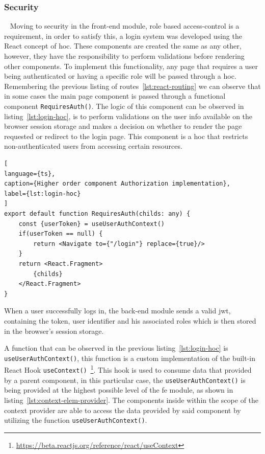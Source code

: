 \subsubsection{Security}~\label{ch:impl:sec:fe:subsec:auth}
Moving to security in the front-end module, role based access-control is a requirement, in order to satisfy this, a login system was developed using the React concept of \acrfull{hoc}. These components are created the same as any other, however, they have the responsibility to perform validations before rendering other components. To implement this functionality, any page that requires a user being authenticated or having a specific role will be passed through a \acrshort{hoc}. Remembering the previous listing of routes~\ref{lst:react-routing} we can observe that in some cases the main page component is passed through a functional component \lstinline{RequiresAuth()}. The logic of this component can be observed in listing~\ref{lst:login-hoc}, is to perform validations on the user info available on the browser session storage and makes a decision on whether to render the page requested or redirect to the login page. 
This component is a \acrshort{hoc} that restricts non-authenticated users from accessing certain resources.


\begin{lstlisting}[
language={ts},
caption={Higher order component Authorization implementation},
label={lst:login-hoc}
]
export default function RequiresAuth(childs: any) {
    const {userToken} = useUserAuthContext()
    if(userToken == null) {
        return <Navigate to={"/login"} replace={true}/>
    }
    return <React.Fragment>
        {childs}
    </React.Fragment>
}
\end{lstlisting}

When a user successfully logs in, the back-end module sends a valid \acrshort{jwt}, containing the token, user identifier and his associated roles which is then stored in the browser's session storage. 

A function that can be observed in the previous listing~\ref{lst:login-hoc} is \lstinline{useUserAuthContext()}, this function is a custom implementation of the built-in React Hook \lstinline{useContext()}~\footnote{\url{https://beta.reactjs.org/reference/react/useContext}}. This hook is used to consume data that provided by a parent component, in this particular case, the \lstinline{useUserAuthContext()} is being provided at the highest possible level of the \acrshort{fe} module, as shown in listing~\ref{lst:context-elem-provider}. The components inside within the scope of the context provider are able to access the data provided by said component by utilizing the function \lstinline{useUserAuthContext()}.

